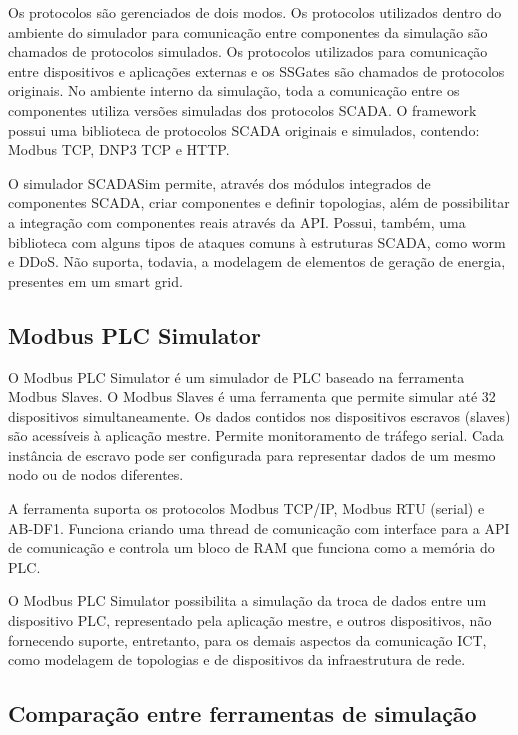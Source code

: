 \documentclass[cic,tc]{iiufrgs}
\begin{document}
Os protocolos são gerenciados de dois modos. Os protocolos utilizados dentro do ambiente do simulador para comunicação entre componentes da simulação são chamados de protocolos simulados. Os protocolos utilizados para comunicação entre dispositivos e aplicações externas e os SSGates são chamados de protocolos originais. No ambiente interno da simulação, toda a comunicação entre os componentes utiliza versões simuladas dos protocolos SCADA. O framework possui uma biblioteca de protocolos SCADA originais e simulados, contendo: Modbus TCP, DNP3 TCP e HTTP.

O simulador SCADASim permite, através dos módulos integrados de componentes SCADA, criar componentes e definir topologias, além de possibilitar a integração com componentes reais através da API. Possui, também, uma biblioteca com alguns tipos de ataques comuns à estruturas SCADA, como worm e DDoS. Não suporta, todavia, a modelagem de elementos de geração de energia, presentes em um smart grid.

\subsection{Modbus PLC Simulator}
O Modbus PLC Simulator \cite{plcsimwebsite} é um simulador de PLC baseado na ferramenta Modbus Slaves. O Modbus Slaves é uma ferramenta que permite simular até 32 dispositivos simultaneamente. Os dados contidos nos dispositivos escravos (slaves) são acessíveis à aplicação mestre. Permite monitoramento de tráfego serial. Cada instância de escravo pode ser configurada para representar dados de um mesmo nodo ou de nodos diferentes.

A ferramenta suporta os protocolos Modbus TCP/IP, Modbus RTU (serial) e AB-DF1. Funciona criando uma thread de comunicação com interface para a API de comunicação e controla um bloco de RAM que funciona como a memória do PLC.

O Modbus PLC Simulator possibilita a simulação da troca de dados entre um dispositivo PLC, representado pela aplicação mestre, e outros dispositivos, não fornecendo suporte, entretanto, para os demais aspectos da comunicação ICT, como modelagem de topologias e de dispositivos da infraestrutura de rede.


\subsection{Comparação entre ferramentas de simulação}
\end{document}

